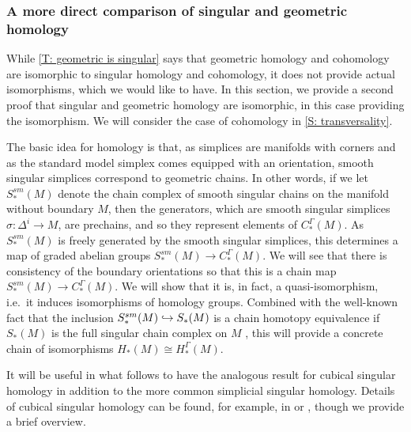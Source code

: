 \subsubsection{A more direct comparison of singular and geometric homology}\label{S: homology direct}

While \cref{T: geometric is singular} says that geometric homology and cohomology are isomorphic to singular homology and cohomology, it does not provide actual isomorphisms, which we would like to have.
In this section, we provide a second proof that singular and geometric homology are isomorphic, in this case providing the isomorphism.
We will consider the case of cohomology in \cref{S: transversality}.

The basic idea for homology is that, as simplices are manifolds with corners and as the standard model simplex comes equipped with an orientation, smooth singular simplices correspond to geometric chains.
In other words, if we let $S^{sm}_*(M)$ denote the chain complex of smooth singular chains on the manifold without boundary $M$, then the generators, which are smooth singular simplices $\sigma \colon \Delta^i \to M$, are prechains, and so they represent elements of $C_*^\Gamma(M)$.
As $S^{sm}_*(M)$ is freely generated by the smooth singular simplices, this determines a map of graded abelian groups $S^{sm}_*(M) \to C_*^\Gamma(M)$.
We will see that there is consistency of the boundary orientations so that this is a chain map $S^{sm}_*(M) \to C_*^\Gamma(M)$.
We will show that it is, in fact, a quasi-isomorphism, i.e.\ it induces isomorphisms of homology groups.
Combined with the well-known fact that the inclusion $S^{sm}_*(M) \hookrightarrow S_*(M)$ is a chain homotopy equivalence if $S_*(M)$ is the full singular chain complex on $M$ \cite[Theorem 18.7]{Lee13}, this will provide a concrete chain of isomorphisms $H_*(M) \cong H_*^\Gamma(M)$.

It will be useful in what follows to have the analogous result for cubical singular homology in addition to the more common simplicial singular homology.
Details of cubical singular homology can be found, for example, in \cite{Mas91} or \cite[Section 8.3]{HW60}, though we provide a brief overview.

